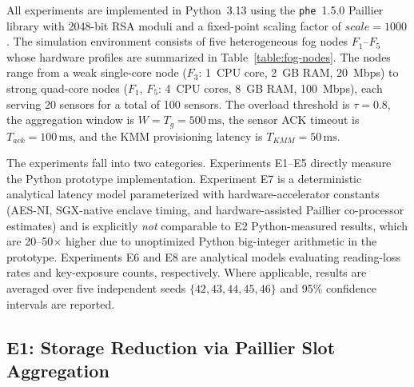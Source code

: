 \documentclass[conference]{IEEEtran}
\begin{document}
    All experiments are implemented in Python~3.13 using the \texttt{phe}~1.5.0 Paillier library with 2048-bit RSA moduli and a fixed-point scaling factor of $scale=1000$. The simulation environment consists of five heterogeneous fog nodes $F_1$--$F_5$ whose hardware profiles are summarized in Table~\ref{table:fog-nodes}. The nodes range from a weak single-core node ($F_3$: 1~CPU core, 2~GB RAM, 20~Mbps) to strong quad-core nodes ($F_1$, $F_5$: 4~CPU cores, 8~GB RAM, 100~Mbps), each serving 20 sensors for a total of 100 sensors. The overload threshold is $\tau=0.8$, the aggregation window is $W=T_g=500\,\text{ms}$, the sensor ACK timeout is $T_{ack}=100\,\text{ms}$, and the KMM provisioning latency is $T_{KMM}=50\,\text{ms}$.

    \begin{table}[htbp]
    \caption{Fog Node Hardware Profiles Used in Simulation}
    \label{table:fog-nodes}
    \centering
    \end{table}

    The experiments fall into two categories. Experiments E1--E5 directly measure the Python prototype implementation. Experiment E7 is a deterministic analytical latency model parameterized with hardware-accelerator constants (AES-NI, SGX-native enclave timing, and hardware-assisted Paillier co-processor estimates) and is explicitly \emph{not} comparable to E2 Python-measured results, which are 20--50$\times$ higher due to unoptimized Python big-integer arithmetic in the prototype. Experiments E6 and E8 are analytical models evaluating reading-loss rates and key-exposure counts, respectively. Where applicable, results are averaged over five independent seeds $\{42,43,44,45,46\}$ and 95\% confidence intervals are reported.

    \subsection{E1: Storage Reduction via Paillier Slot Aggregation}
    \label{sec:eval-e1}
\end{document}

